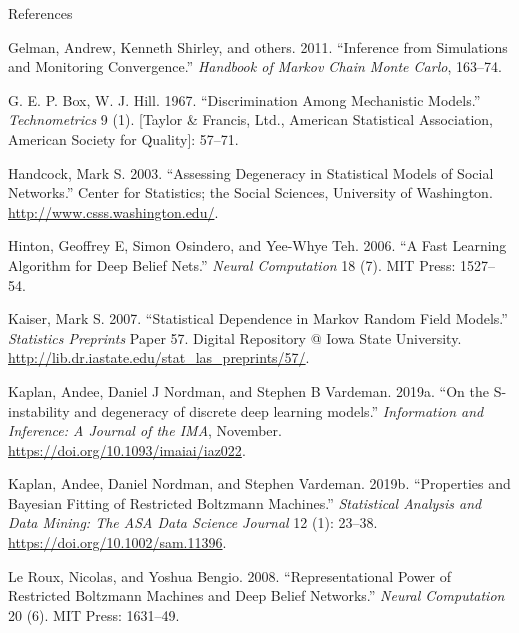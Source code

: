 \documentclass[ignorenonframetext,]{beamer}
\theoremstyle{definition}
\begin{document}
\begin{frame}[allowframebreaks]{References}
\protect\hypertarget{references}{}

\tiny

\hypertarget{refs}{}
\leavevmode\hypertarget{ref-gelman2011inference}{}%
Gelman, Andrew, Kenneth Shirley, and others. 2011. ``Inference from
Simulations and Monitoring Convergence.'' \emph{Handbook of Markov Chain
Monte Carlo}, 163--74.

\leavevmode\hypertarget{ref-box1967discrimination}{}%
G. E. P. Box, W. J. Hill. 1967. ``Discrimination Among Mechanistic
Models.'' \emph{Technometrics} 9 (1). {[}Taylor \& Francis, Ltd.,
American Statistical Association, American Society for Quality{]}:
57--71.

\leavevmode\hypertarget{ref-handcock2003assessing}{}%
Handcock, Mark S. 2003. ``Assessing Degeneracy in Statistical Models of
Social Networks.'' Center for Statistics; the Social Sciences,
University of Washington. \url{http://www.csss.washington.edu/}.

\leavevmode\hypertarget{ref-hinton2006fast}{}%
Hinton, Geoffrey E, Simon Osindero, and Yee-Whye Teh. 2006. ``A Fast
Learning Algorithm for Deep Belief Nets.'' \emph{Neural Computation} 18
(7). MIT Press: 1527--54.

\leavevmode\hypertarget{ref-kaiser2007statistical}{}%
Kaiser, Mark S. 2007. ``Statistical Dependence in Markov Random Field
Models.'' \emph{Statistics Preprints} Paper 57. Digital Repository @
Iowa State University.
\url{http://lib.dr.iastate.edu/stat_las_preprints/57/}.

\leavevmode\hypertarget{ref-kaplan2016note}{}%
Kaplan, Andee, Daniel J Nordman, and Stephen B Vardeman. 2019a. ``On the
S-instability and degeneracy of discrete deep learning models.''
\emph{Information and Inference: A Journal of the IMA}, November.
\url{https://doi.org/10.1093/imaiai/iaz022}.

\leavevmode\hypertarget{ref-kaplan2019properties}{}%
Kaplan, Andee, Daniel Nordman, and Stephen Vardeman. 2019b. ``Properties
and Bayesian Fitting of Restricted Boltzmann Machines.''
\emph{Statistical Analysis and Data Mining: The ASA Data Science
Journal} 12 (1): 23--38. \url{https://doi.org/10.1002/sam.11396}.

\leavevmode\hypertarget{ref-le2008representational}{}%
Le Roux, Nicolas, and Yoshua Bengio. 2008. ``Representational Power of
Restricted Boltzmann Machines and Deep Belief Networks.'' \emph{Neural
Computation} 20 (6). MIT Press: 1631--49.


\end{frame}
\end{document}
